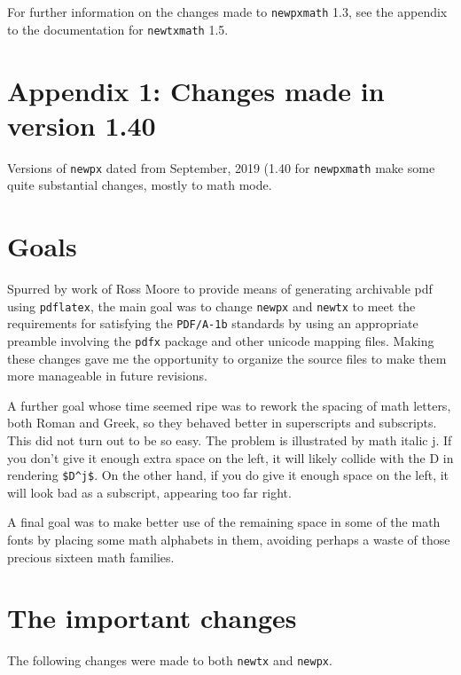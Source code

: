 \documentclass[11pt]{article}
\theoremstyle{oldplain}
\theoremstyle{plain}
\begin{document}
For further information on the changes made to \texttt{newpxmath} 1.3, see the appendix to the documentation for \texttt{newtxmath} 1.5.

\def\jj{\mkern-3mu j}

\section{Appendix 1: Changes made in version 1.40}
Versions of {\tt newpx}  dated from September, 2019 (1.40 for {\tt newpxmath} make some quite substantial changes, mostly to math mode. 

\section{Goals}
Spurred by work of Ross Moore to provide means of generating archivable pdf using {\tt pdflatex}, the main goal was to change {\tt newpx} and {\tt newtx} to meet the requirements for satisfying the {\tt PDF/A-1b} standards by using an appropriate preamble involving the {\tt pdfx} package and other unicode mapping files. Making these  changes  gave me the opportunity to organize the source files to make them more manageable in  future revisions. 

A further goal whose time seemed ripe was to rework the  spacing of math letters, both Roman and Greek, so they behaved better in superscripts and subscripts. This did not turn out to be so easy. The problem is illustrated by math italic j. If you don't give it enough extra space on the left, it will likely collide with the D in rendering \verb|$D^j$|. On the other hand, if you do give it enough space on the left, it will look bad as a  subscript, appearing too far right. 

A final goal was to make better use of the remaining space in some of the math fonts by placing some math alphabets in them, avoiding perhaps a waste of those precious sixteen math families.

\section{The important changes}
The following changes were made to both {\tt newtx} and {\tt newpx}.
\end{document}
